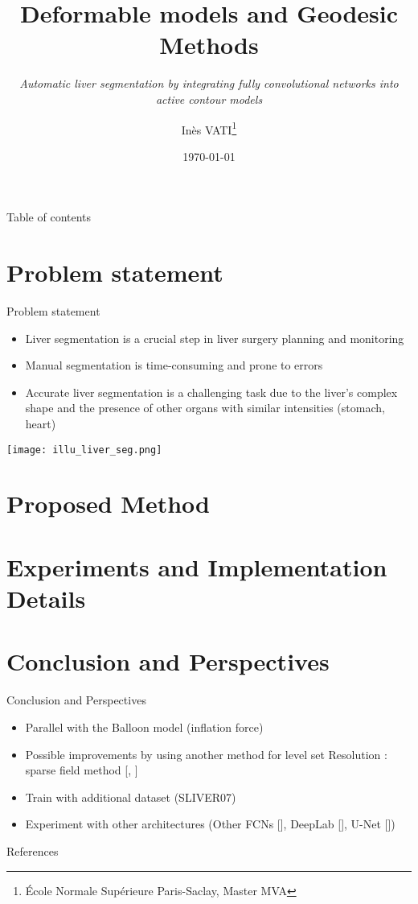 \documentclass[hyperref={pdftex}]{beamer}
\title{Deformable models and Geodesic Methods}
\subtitle{\textit{Automatic liver segmentation by integrating fully convolutional networks into active contour models}}
\author{Inès VATI\thanks{École Normale Supérieure Paris-Saclay, Master MVA}} %
\institute[MVA]{\texttt{[image: mva logo.png]}}
\date{ \today } %
\begin{document}
\begin{frame}[plain]
  \titlepage
\end{frame}    

\begin{frame}{Table of contents}
  \tableofcontents
\end{frame}

\section{Problem statement}
\begin{frame}{Problem statement}
  \begin{itemize}
    \item Liver segmentation is a crucial step in liver surgery planning and monitoring
    \item Manual segmentation is time-consuming and prone to errors
    \item Accurate liver segmentation is a challenging task due to the liver's complex shape and the presence of other organs with similar intensities (stomach, heart)
  \end{itemize}
  \vfill
  \begin{center}
    \texttt{[image: illu\_liver\_seg.png]}
  \end{center}
\end{frame}

\section{Proposed Method}


\section{Experiments and Implementation Details}


\section{Conclusion and Perspectives}
\begin{frame}{Conclusion and Perspectives}
  \begin{itemize}
    \item Parallel with the Balloon model (inflation force)
    \item Possible improvements by using another method for level set Resolution : sparse field method [, ]
    \item Train with additional dataset (SLIVER07)
    \item Experiment with other architectures (Other FCNs 
    [], DeepLab [], U-Net [])
\end{itemize}
\end{frame}

\begin{frame}[allowframebreaks]{References}
    \printbibliography
\end{frame}
\end{document}
